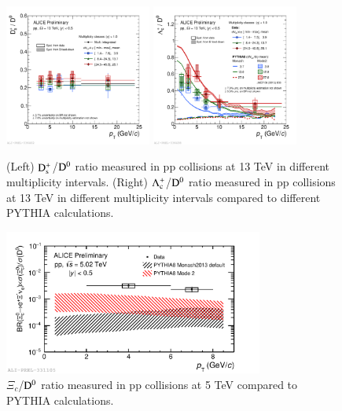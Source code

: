 \documentclass[3p,times,procedia]{elsarticle}
\newcommand{\Dzero}{{\rm D^0}}
\newcommand{\Ds}{{\rm D_{s}^+}}
\newcommand{\Lc}{{\rm \Lambda_{c}^+}}
\begin{document}
\begin{figure}[h]
\includegraphics[width=0.43\textwidth]{Plots/ppHM/2019-10-31-2019-10-31-DsOverD0_allMult_MB.pdf}
\includegraphics[width=0.43\textwidth]{Plots/ppHM/2019-10-31-2019-10-31-LcpKpiOverD0_wPythiaMonashMode2_allMult.pdf}
\caption{
	(Left) $\Ds$/$\Dzero$ ratio measured in pp collisions at 13 TeV in different multiplicity intervals. 
	(Right) $\Lc$/$\Dzero$ ratio measured in pp collisions at 13 TeV in different multiplicity intervals compared to different PYTHIA calculations.} 
\label{fig:highmult}
\end{figure}
\begin{figure}[h]
\includegraphics[width=0.76\textwidth]{Plots/Xi_c/2019-10-28-2019-10-28-Xic0toD0_5TeV_wModel1.pdf}
\caption{$\Xi_{c}$/$\Dzero$ ratio measured in pp collisions at 5 TeV compared to PYTHIA calculations.}
\label{fig:future}
\end{figure}
\end{document}

